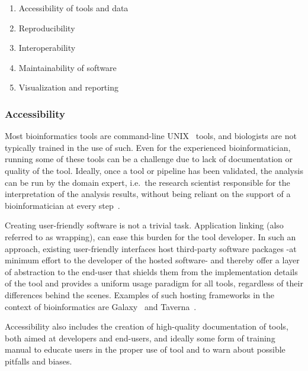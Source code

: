 \begin{justify}
\begin{enumerate}
    \itemsep-0.5em
    \item Accessibility of tools and data %
    \item Reproducibility %
    \item Interoperability %
    \item Maintainability of software %
    \item Visualization and reporting
\end{enumerate}


\subsubsection{Accessibility}
Most bioinformatics tools are command-line UNIX~\cite{url-unix} tools, and biologists are not typically trained in the use of such. Even for the experienced bioinformatician, running some of these tools can be a challenge due to lack of documentation or quality of the tool. Ideally, once a tool or pipeline has been validated, the analysis can be run by the domain expert, i.e.\ the research scientist responsible for the interpretation of the analysis results, without being reliant on the support of a bioinformatician at every step~\cite{kumar2007bioinformatics}.

Creating user-friendly software is not a trivial task. Application linking (also referred to as wrapping), can ease this burden for the tool developer. In such an approach, existing user-friendly interfaces host third-party software packages -at minimum effort to the developer of the hosted software- and thereby offer a layer of abstraction to the end-user that shields them from the implementation details of the tool and provides a uniform usage paradigm for all tools, regardless of their differences behind the scenes. Examples of such hosting frameworks in the context of bioinformatics are Galaxy~\cite{giardine2005galaxy,goecks2010galaxy} and Taverna~\cite{oinn2004taverna}.

Accessibility also includes the creation of high-quality documentation of tools, both aimed at developers and end-users, and ideally some form of training manual to educate users in the proper use of tool and to warn about possible pitfalls and biases.


\end{justify}

